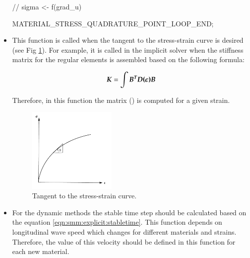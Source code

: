 \begin{itemize}
\begin{cpp}
    // sigma <- f(grad_u)

    MATERIAL_STRESS_QUADRATURE_POINT_LOOP_END;
  \end{cpp}




\item {} This function is called when the tangent to
  the stress-strain curve is desired (see Fig \ref {fig:smm:AL:K}).  For
  example, it is called in the implicit solver when the stiffness matrix for the
  regular elements is assembled based on the following formula:

  \begin{equation} \label{eqn:smm:constitutive_elasc}
    \boldsymbol{K } =\int{\ensuremath{\boldsymbol{B^T}}\ensuremath{\boldsymbol{D(\epsilon)}}\ensuremath{\boldsymbol{B}}}
  \end{equation}

  Therefore, in this function the  matrix () is computed
  for a given strain.


  \begin{figure}[!htb]
    \begin{center}
      \includegraphics[width=0.4\textwidth,keepaspectratio=true]{figures/tangent.pdf}
      \caption{Tangent to the stress-strain curve.}
      \label{fig:smm:AL:K}
    \end{center}
  \end{figure}


\item {} For the dynamic methods the stable time step
  should be calculated based on the equation \ref{eqn:smm:explicit:stabletime}.
  This function depends on longitudinal wave speed which changes for different
  materials and strains. Therefore, the value of this velocity should be defined
  in this function for each new material.


\end{itemize}

